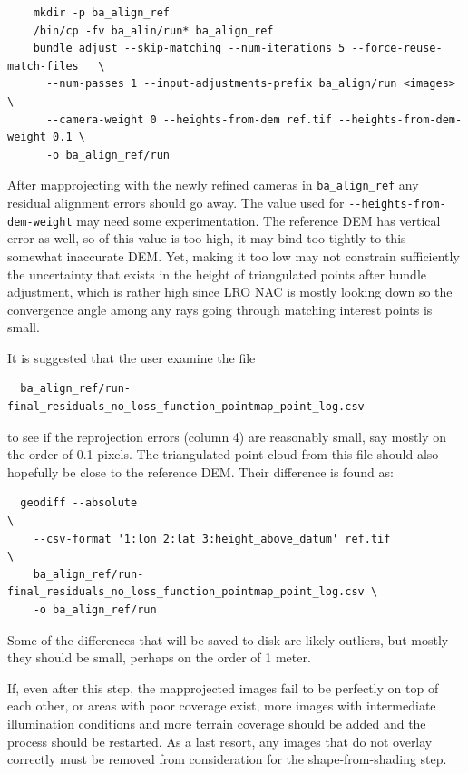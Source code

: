 \begin{verbatim}
    mkdir -p ba_align_ref
    /bin/cp -fv ba_alin/run* ba_align_ref
    bundle_adjust --skip-matching --num-iterations 5 --force-reuse-match-files   \
      --num-passes 1 --input-adjustments-prefix ba_align/run <images>            \
      --camera-weight 0 --heights-from-dem ref.tif --heights-from-dem-weight 0.1 \ 
      -o ba_align_ref/run
\end{verbatim}

After mapprojecting with the newly refined cameras in \texttt{ba\_align\_ref}
any residual alignment errors should go away. The value used for
\texttt{-\/-heights-from-dem-weight} may need some experimentation. The reference
DEM has vertical error as well, so of this value is too high, it may bind too
tightly to this somewhat inaccurate DEM. Yet, making it too low may not
constrain sufficiently the uncertainty that exists in the height of triangulated
points after bundle adjustment, which is rather high since LRO NAC is mostly looking
down so the convergence angle among any rays going through matching interest points
is small.

It is suggested that the user examine the file
\begin{verbatim}
  ba_align_ref/run-final_residuals_no_loss_function_pointmap_point_log.csv
\end{verbatim}

to see if the reprojection errors (column 4) are reasonably small, say mostly
on the order of 0.1 pixels. The triangulated point cloud
from this file should also hopefully be close to the reference DEM. Their
difference is found as:
\begin{verbatim}
  geodiff --absolute                                                         \
    --csv-format '1:lon 2:lat 3:height_above_datum' ref.tif                  \
    ba_align_ref/run-final_residuals_no_loss_function_pointmap_point_log.csv \
    -o ba_align_ref/run
\end{verbatim}

Some of the differences that will be saved to disk are likely outliers,
but mostly they should be small, perhaps on the order of 1 meter.

If, even after this step, the mapprojected images fail to be perfectly
on top of each other, or areas with poor coverage exist, more images
with intermediate illumination conditions and more terrain coverage
should be added and the process should be restarted. As a last resort,
any images that do not overlay correctly must be removed from
consideration for the shape-from-shading step.

